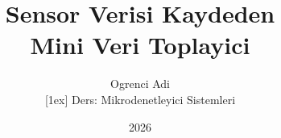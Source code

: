\title[Veri Toplayici v2]{Sensor Verisi Kaydeden\\Mini Veri Toplayici}
\author[Ogrenci]{Ogrenci Adi \texorpdfstring{\\}{} [1ex]
  {\small Ders: Mikrodenetleyici Sistemleri}}
\date[]{2026}
